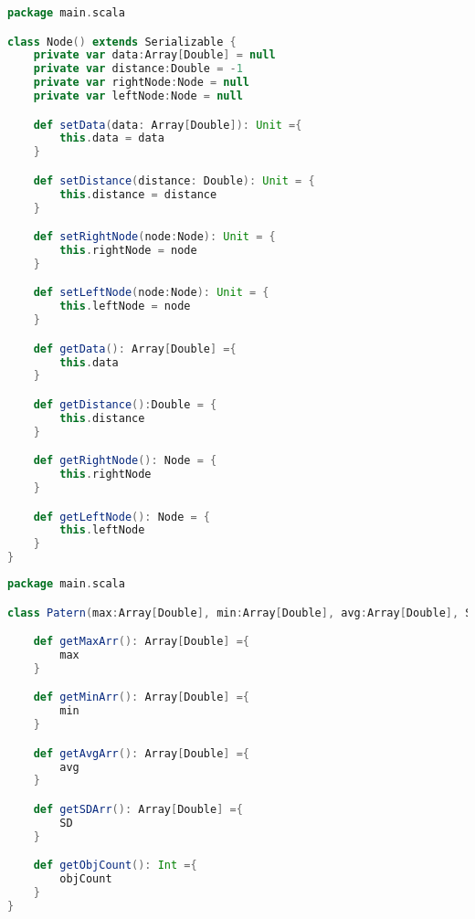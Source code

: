 \begin{lstlisting}[language=Scala, caption=Node.scala]
package main.scala

class Node() extends Serializable {
    private var data:Array[Double] = null
    private var distance:Double = -1
    private var rightNode:Node = null
    private var leftNode:Node = null

    def setData(data: Array[Double]): Unit ={
        this.data = data
    }

    def setDistance(distance: Double): Unit = {
        this.distance = distance
    }

    def setRightNode(node:Node): Unit = {
        this.rightNode = node
    }

    def setLeftNode(node:Node): Unit = {
        this.leftNode = node
    }

    def getData(): Array[Double] ={
        this.data
    }

    def getDistance():Double = {
        this.distance
    }

    def getRightNode(): Node = {
        this.rightNode
    }

    def getLeftNode(): Node = {
        this.leftNode
    }
}
\end{lstlisting}

\begin{lstlisting}[language=Scala, caption=Node.scala]
package main.scala

class Patern(max:Array[Double], min:Array[Double], avg:Array[Double], SD:Array[Double], objCount:Int) extends Serializable {

    def getMaxArr(): Array[Double] ={
        max
    }

    def getMinArr(): Array[Double] ={
        min
    }

    def getAvgArr(): Array[Double] ={
        avg
    }

    def getSDArr(): Array[Double] ={
        SD
    }

    def getObjCount(): Int ={
        objCount
    }
}
\end{lstlisting}